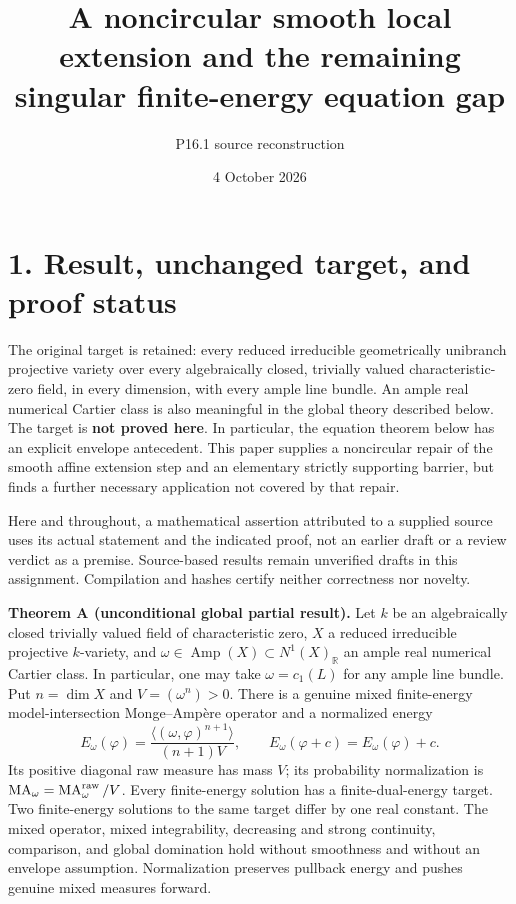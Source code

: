 \documentclass[
  11pt,
]{article}
\title{A noncircular smooth local extension and the remaining singular
finite-energy equation gap}
\author{P16.1 source reconstruction}
\date{4 October 2026}
\begin{document}
\maketitle

\section{1. Result, unchanged target, and proof
status}\label{result-unchanged-target-and-proof-status}

The original target is retained: every reduced irreducible geometrically
unibranch projective variety over every algebraically closed, trivially
valued characteristic-zero field, in every dimension, with every ample
line bundle. An ample real numerical Cartier class is also meaningful in
the global theory described below. The target is \textbf{not proved
here}. In particular, the equation theorem below has an explicit
envelope antecedent. This paper supplies a noncircular repair of the
smooth affine extension step and an elementary strictly supporting
barrier, but finds a further necessary application not covered by that
repair.

Here and throughout, a mathematical assertion attributed to a supplied
source uses its actual statement and the indicated proof, not an earlier
draft or a review verdict as a premise. Source-based results remain
unverified drafts in this assignment. Compilation and hashes certify
neither correctness nor novelty.

\textbf{Theorem A (unconditional global partial result).} Let \(k\) be
an algebraically closed trivially valued field of characteristic zero,
\(X\) a reduced irreducible projective \(k\)-variety, and
\(\omega\in\operatorname{Amp}(X)\subset N^1(X)_{\mathbb R}\) an ample
real numerical Cartier class. In particular, one may take
\(\omega=c_1(L)\) for any ample line bundle. Put \(n=\dim X\) and
\(V=(\omega^n)>0\). There is a genuine mixed finite-energy
model-intersection Monge--Ampère operator and a normalized energy \[
 E_\omega(\varphi)=\frac{\langle(\omega,\varphi)^{n+1}\rangle}{(n+1)V},
 \qquad E_\omega(\varphi+c)=E_\omega(\varphi)+c.
\] Its positive diagonal raw measure has mass \(V\); its probability
normalization is
\(\operatorname{MA}_\omega=\operatorname{MA}^{\rm raw}_\omega/V\). Every
finite-energy solution has a finite-dual-energy target. Two
finite-energy solutions to the same target differ by one real constant.
The mixed operator, mixed integrability, decreasing and strong
continuity, comparison, and global domination hold without smoothness
and without an envelope assumption. Normalization preserves pullback
energy and pushes genuine mixed measures forward.
\end{document}
